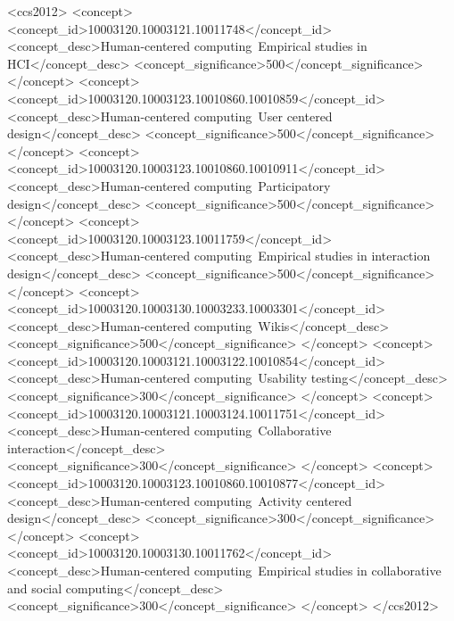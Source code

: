 \documentclass[sigconf]{acmart}
\begin{document}


\begin{CCSXML}
<ccs2012>
<concept>
<concept_id>10003120.10003121.10011748</concept_id>
<concept_desc>Human-centered computing~Empirical studies in HCI</concept_desc>
<concept_significance>500</concept_significance>
</concept>
<concept>
<concept_id>10003120.10003123.10010860.10010859</concept_id>
<concept_desc>Human-centered computing~User centered design</concept_desc>
<concept_significance>500</concept_significance>
</concept>
<concept>
<concept_id>10003120.10003123.10010860.10010911</concept_id>
<concept_desc>Human-centered computing~Participatory design</concept_desc>
<concept_significance>500</concept_significance>
</concept>
<concept>
<concept_id>10003120.10003123.10011759</concept_id>
<concept_desc>Human-centered computing~Empirical studies in interaction design</concept_desc>
<concept_significance>500</concept_significance>
</concept>
<concept>
<concept_id>10003120.10003130.10003233.10003301</concept_id>
<concept_desc>Human-centered computing~Wikis</concept_desc>
<concept_significance>500</concept_significance>
</concept>
<concept>
<concept_id>10003120.10003121.10003122.10010854</concept_id>
<concept_desc>Human-centered computing~Usability testing</concept_desc>
<concept_significance>300</concept_significance>
</concept>
<concept>
<concept_id>10003120.10003121.10003124.10011751</concept_id>
<concept_desc>Human-centered computing~Collaborative interaction</concept_desc>
<concept_significance>300</concept_significance>
</concept>
<concept>
<concept_id>10003120.10003123.10010860.10010877</concept_id>
<concept_desc>Human-centered computing~Activity centered design</concept_desc>
<concept_significance>300</concept_significance>
</concept>
<concept>
<concept_id>10003120.10003130.10011762</concept_id>
<concept_desc>Human-centered computing~Empirical studies in collaborative and social computing</concept_desc>
<concept_significance>300</concept_significance>
</concept>
</ccs2012>
\end{CCSXML}

\end{document}
